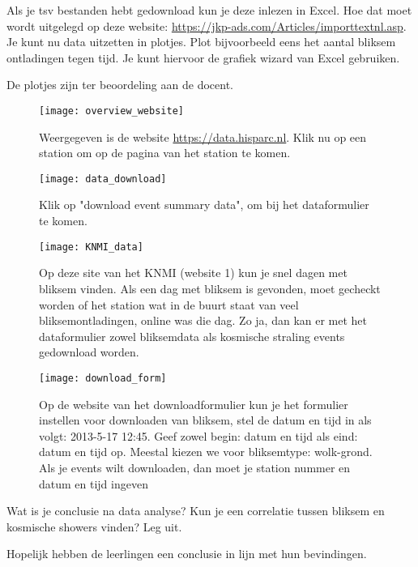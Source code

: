 \begin{questions}
\question
Als je tsv bestanden hebt gedownload kun je deze inlezen in Excel. Hoe dat moet
wordt uitgelegd op deze website: \url{https://jkp-ads.com/Articles/importtextnl.asp}.
Je kunt nu data uitzetten in plotjes.
Plot bijvoorbeeld eens het aantal bliksem ontladingen tegen tijd.
Je kunt hiervoor de grafiek wizard van Excel gebruiken.
\begin{solution}
    De plotjes zijn ter beoordeling aan de docent.
\end{solution}

\begin{figure}
    \centering
    \texttt{[image: overview\_website]}
    \caption{Weergegeven is de website \protect\url{https://data.hisparc.nl}.
    Klik nu op een station om op de pagina van
    het station te komen.}
    \label{fig:overview_website}
\end{figure}

\begin{figure}
    \centering
    \texttt{[image: data\_download]}
    \caption{Klik op "download event summary data", om bij het dataformulier te komen.}
    \label{fig:data_download}
\end{figure}

\begin{figure}
    \centering
    \texttt{[image: KNMI\_data]}
    \caption{Op deze site van het KNMI (website 1) kun je snel dagen met bliksem vinden. Als een dag
    met bliksem is gevonden, moet gecheckt worden of het \hisparc station wat in de
    buurt staat van veel bliksemontladingen, online was die dag. Zo ja, dan kan
    er met het dataformulier zowel bliksemdata als kosmische straling events
    gedownload worden.}
    \label{fig:KNMI_data}
\end{figure}

\begin{figure}
    \centering
    \texttt{[image: download\_form]}
    \caption{Op de website van het downloadformulier kun je het formulier
    instellen voor downloaden van bliksem, stel de datum en tijd in als volgt:
    2013-5-17 12:45. Geef zowel begin: datum en tijd als eind: datum en tijd op. Meestal
    kiezen we voor bliksemtype: wolk-grond. Als je events wilt downloaden, dan
    moet je station nummer en datum en tijd ingeven }
    \label{fig:download_form}
\end{figure}


\question
Wat is je conclusie na data analyse? Kun je een correlatie tussen bliksem en
kosmische showers vinden? Leg uit.
\begin{solution}
    Hopelijk hebben de leerlingen een conclusie in lijn met hun bevindingen.
\end{solution}

\end{questions}

